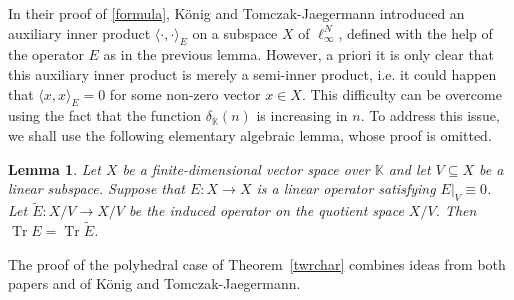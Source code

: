 \documentclass[12pt, reqno]{amsart}
\newtheorem{lem}[twr]{Lemma}
\theoremstyle{definition}
\theoremstyle{remark}
\numberwithin{equation}{section}
\DeclareMathOperator{\tr}{Tr}
\begin{document}
In their proof of \eqref{formula}, K\"onig and Tomczak-Jaegermann introduced an auxiliary inner product $\langle \cdot, \cdot \rangle_E$ on a subspace $X$ of $\ell_{\infty}^N$, defined with the help of the operator $E$ as in the previous lemma. However, a priori it is only clear that this auxiliary inner product is merely a semi-inner product, i.e. it could happen that $\langle x, x \rangle_E=0$ for some non-zero vector $x \in X$. This difficulty can be overcome using the fact that the function $\delta_{\mathbb K}(n)$ is increasing in $n$. To address this issue, we shall use the following elementary algebraic lemma, whose proof is omitted.

\begin{lem}
\label{lemtrace}
Let $X$ be a finite-dimensional vector space over $\mathbb{K}$ and let $V \subseteq X$ be a linear subspace. Suppose that $E: X \to X$ is a linear operator satisfying $E|_V \equiv 0$. Let $\widetilde{E}:X/V \to X/V$ be the induced operator on the quotient space $X/V$. Then $\tr E = \tr \widetilde{E}$.
\end{lem}


The proof of the polyhedral case of Theorem~\ref{twrchar} combines ideas from both papers \cite{konigtomczak} and \cite{konigtomczak2} of K\"onig and Tomczak-Jaegermann.
\end{document}

